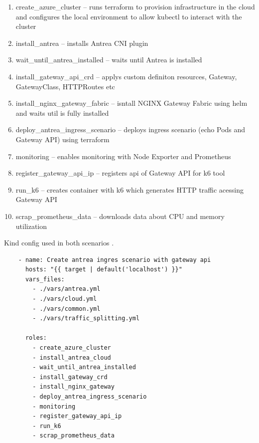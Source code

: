 \begin{enumerate}
  \item create\_azure\_cluster -- runs terraform to provision infrastructure in the cloud and configures the local environment to allow kubectl to interact with the cluster
  \item install\_antrea -- installs Antrea CNI plugin
  \item wait\_until\_antrea\_installed -- waits until Antrea is installed
  \item install\_gateway\_api\_crd -- applys custom definiton resources, Gateway, GatewayClass, HTTPRoutes etc
  \item install\_nginx\_gateway\_fabric -- isntall NGINX Gateway Fabric using helm and waits util is fully installed
  \item deploy\_antrea\_ingress\_scenario -- deploys ingress scenario (echo Pods and Gateway API) using terraform
  \item monitoring -- enables monitoring with Node Exporter and Prometheus
  \item register\_gateway\_api\_ip -- registers api of Gateway API for k6 tool
  \item run\_k6 -- creates container with k6 which generates HTTP traffic acessing Gateway API
  \item scrap\_prometheus\_data -- downloads data about CPU and memory utilization
\end{enumerate}

\begin{listing}[H]
  \centering
  \caption{Kind config used in both scenarios \cite{KindConfig}.}
  \begin{verbatim}
    - name: Create antrea ingres scenario with gateway api
      hosts: "{{ target | default('localhost') }}"
      vars_files:
        - ./vars/antrea.yml
        - ./vars/cloud.yml
        - ./vars/common.yml
        - ./vars/traffic_splitting.yml

      roles:
        - create_azure_cluster
        - install_antrea_cloud
        - wait_until_antrea_installed
        - install_gateway_crd
        - install_nginx_gateway
        - deploy_antrea_ingress_scenario
        - monitoring
        - register_gateway_api_ip
        - run_k6
        - scrap_prometheus_data
  \end{verbatim}
  \label{lst:antreaIngressPlaybook}
\end{listing}


